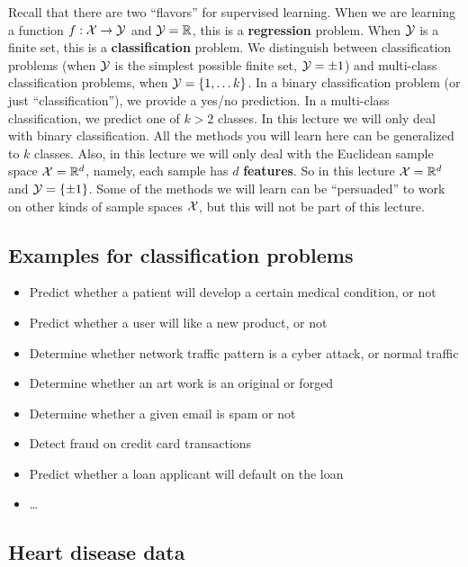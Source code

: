 \documentclass[11pt]{article}
\newcommand{\R}{\ensuremath{\mathbb{R}}}
\begin{document}
Recall that there are two ``flavors'' for supervised learning. When we are
learning a function $f:\mathcal{X}\to\mathcal{Y}$ and $\Y=\R$, this is a {\bf regression} problem.
When $\mathcal{Y}$ is a finite set, this is a {\bf classification} problem. We
distinguish between classification problems (when $\mathcal{Y}$
is the simplest possible finite set, $\mathcal{Y}={\pm 1}$) and multi-class
classification problems, when $\mathcal{Y}=\left\{ 1,\dots k \right\}$. In a binary classification
problem (or just ``classification''), we provide a  yes/no prediction. In a multi-class classification, we
predict one of $k>2$ classes. In this lecture we will only deal with
binary classification. All the methods you will learn here can be generalized to
$k$ classes. Also, in this lecture we will only deal with the Euclidean sample space
$\mathcal{X}=\mathbb{R}^d$, namely, each sample has $d$ {\bf features}. So in this lecture $\mathcal{X}=\mathbb{R}^d$ and $\mathcal{Y}=\left\{ \pm1 \right\}$.
Some of the methods we will learn can be ``persuaded'' to work on other kinds of
sample spaces $\mathcal{X}$, but this will not be part of this lecture. 


\subsection{Examples for classification problems}

 \begin{itemize}
   \item Predict whether a patient will develop a certain medical condition, or not
   \item Predict whether a user will like a new product, or not
   \item Determine whether network traffic pattern is a cyber attack, or normal
     traffic
    \item Determine whether an art work is an original or forged
    \item Determine whether a given email is spam or not
      \item Detect fraud on credit card transactions
        \item Predict whether a loan applicant will default on the loan
    \item \ldots
  \end{itemize}

  \subsection{Heart disease data}
\end{document}
